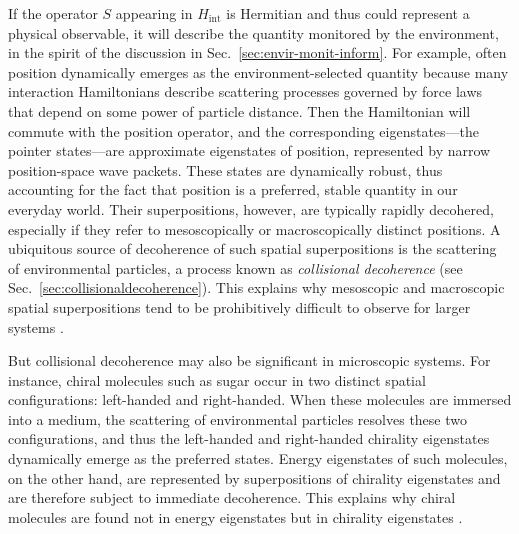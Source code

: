 \documentclass[3p,sort&compress]{elsarticle}
\newcommand{\op}[1]{#1}
\begin{document}
If the operator $\op{S}$ appearing in $\op{H}_\text{int}$ is Hermitian and thus could represent a physical observable, it will describe the quantity monitored by the environment, in the spirit of the discussion in Sec.~\ref{sec:envir-monit-inform}. For example, often position dynamically emerges as the environment-selected quantity because many interaction Hamiltonians describe scattering processes governed by force laws that depend on some power of particle distance. Then the Hamiltonian will commute with the position operator, and the corresponding eigenstates---the pointer states---are approximate eigenstates of position, represented by narrow position-space wave packets. These states are dynamically robust, thus accounting for the fact that position is a preferred, stable quantity in our everyday world. Their superpositions, however, are typically rapidly decohered, especially if they refer to mesoscopically or macroscopically distinct positions. A ubiquitous source of decoherence of such spatial superpositions is the scattering of environmental particles, a process known as \emph{collisional decoherence} (see Sec.~\ref{sec:collisionaldecoherence}). This explains why mesoscopic and macroscopic spatial superpositions tend to be prohibitively difficult to observe for larger systems \cite{Zurek:1981:dd,Zurek:1982:tv,Joos:1985:iu,Zurek:1991:vv,Gallis:1990:un,Diosi:1995:um,Hornberger:2003:un,Hornberger:2006:tb,Hornberger:2008:ii,Busse:2009:aa,Busse:2010:aa}. 

But collisional decoherence may also be significant in microscopic systems. For instance, chiral molecules such as sugar occur in two distinct spatial configurations: left-handed and right-handed. When these molecules are immersed into a medium, the scattering of environmental particles resolves these two configurations, and thus the left-handed and right-handed chirality eigenstates dynamically emerge as the preferred states. Energy eigenstates of such molecules, on the other hand, are represented by superpositions of chirality eigenstates and are therefore subject to immediate decoherence. This explains why chiral molecules are found not in energy eigenstates but in chirality eigenstates \cite{Harris:1981:rc,Zeh:1999:qr,Trost:2009:ll,Bahrami:2012:oo}. 
\end{document}
